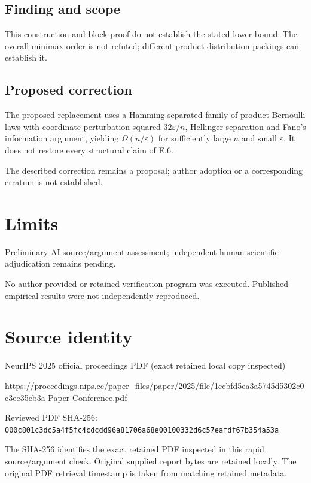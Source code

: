 \documentclass[11pt]{article}
\begin{document}
\subsection*{Finding and scope}

This construction and block proof do not establish the stated lower bound. The overall minimax order is not refuted; different product-distribution packings can establish it.

\subsection*{Proposed correction}

The proposed replacement uses a Hamming-separated family of product Bernoulli laws with coordinate perturbation squared \(32\varepsilon/n\), Hellinger separation and Fano’s information argument, yielding \(\Omega(n/\varepsilon)\) for sufficiently large \(n\) and small \(\varepsilon\). It does not restore every structural claim of E.6.

The described correction remains a proposal; author adoption or a corresponding erratum is not established.

\section*{Limits}

Preliminary AI source/argument assessment; independent human scientific adjudication remains pending.\par

No author-provided or retained verification program was executed. Published empirical results were not independently reproduced.\par

\section*{Source identity}

NeurIPS 2025 official proceedings PDF (exact retained local copy inspected)

\url{https://proceedings.nips.cc/paper_files/paper/2025/file/1ecbfd5ea3a5745d5302c0c3ee35eb3a-Paper-Conference.pdf}

Reviewed PDF SHA-256: \nolinkurl{000c801c3dc5a4f5fc4cdcdd96a81706a68e00100332d6c57eafdf67b354a53a}

The SHA-256 identifies the exact retained PDF inspected in this rapid source/argument check. Original supplied report bytes are retained locally. The original PDF retrieval timestamp is taken from matching retained metadata.
\end{document}
